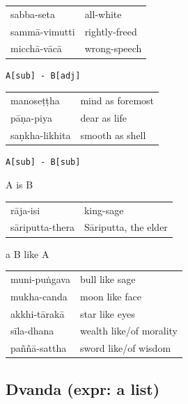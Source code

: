 \documentclass[11pt,oneside]{memoir}
\begin{document}
\begin{center}
\begin{tabular}{ll}
sabba-seta & all-white\\
sammā-vimutti & rightly-freed\\
micchā-vācā & wrong-speech\\
\end{tabular}
\end{center}

\begin{verbatim}
A[sub] - B[adj]
\end{verbatim}


\begin{center}
\begin{tabular}{ll}
manoseṭṭha & mind as foremost\\
pāṇa-piya & dear as life\\
saṇkha-likhita & smooth as shell\\
\end{tabular}
\end{center}

\begin{verbatim}
A[sub] - B[sub]
\end{verbatim}


A is B

\begin{center}
\begin{tabular}{ll}
rāja-isi & king-sage\\
sāriputta-thera & Sāriputta, the elder\\
\end{tabular}
\end{center}

a B like A

\begin{center}
\begin{tabular}{ll}
muni-puṅgava & bull like sage\\
mukha-canda & moon like face\\
akkhi-tārakā & star like eyes\\
sīla-dhana & wealth like/of morality\\
paññā-sattha & sword like/of wisdom\\
\end{tabular}
\end{center}
\subsection{Dvanda (expr: a list)}
\label{sec:org582253d}
\end{document}

